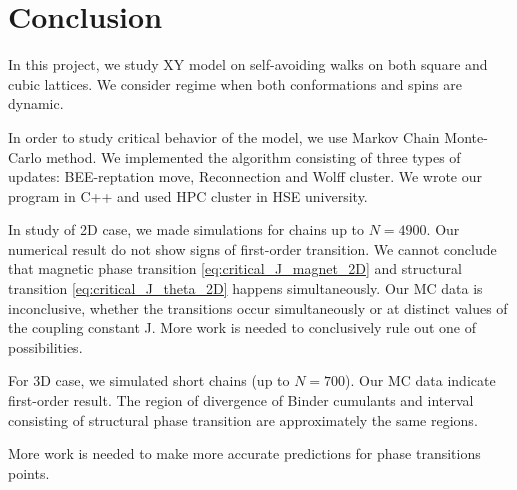 \chapter{Conclusion} \label{ch:conclusion}

 In this project, we study XY model on self-avoiding walks on both square and cubic lattices. We consider regime when both conformations and spins are dynamic.
 
 In order to study critical behavior of the model, we use Markov Chain Monte-Carlo method. We implemented the algorithm consisting of  three types of updates: BEE-reptation move, Reconnection and Wolff cluster. We wrote our program in C++ and used HPC cluster in HSE university. 
 
  In study of 2D case, we made simulations for chains up to $N=4900$. Our  numerical result do not show signs of first-order transition.  We cannot conclude that magnetic phase transition \eqref{eq:critical_J_magnet_2D} and structural transition \eqref{eq:critical_J_theta_2D}  happens simultaneously.  Our MC  data is inconclusive, whether the transitions occur simultaneously or at distinct values of the coupling constant J. More work is needed to conclusively rule out one of possibilities.
  
  For 3D case, we simulated short chains (up to $N=700$). Our MC data indicate first-order result. The region of divergence of Binder cumulants and interval consisting of structural phase transition are approximately the same regions. 
  
 More work is needed to make more accurate predictions for phase transitions points.
